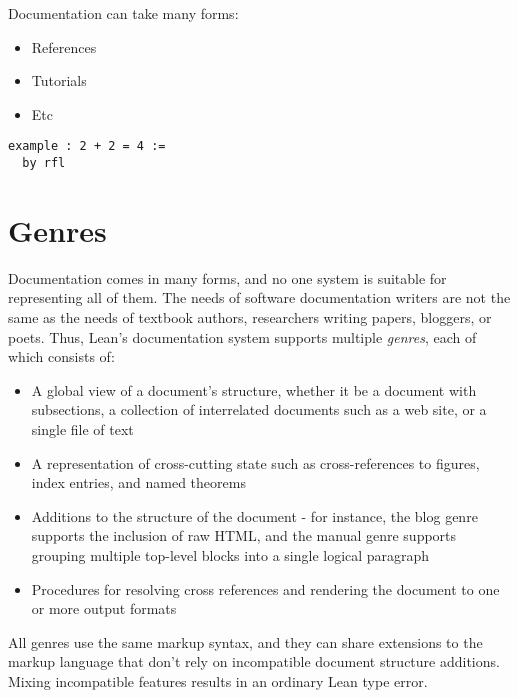\documentclass{memoir}
\begin{document}
Documentation can take many forms:

\begin{itemize}
\item References\item Tutorials\item Etc
\end{itemize}


\begin{verbatim}
example : 2 + 2 = 4 :=
  by rfl

\end{verbatim}














\chapter{Genres}

Documentation comes in many forms, and no one system is suitable for representing all of them.
The needs of software documentation writers are not the same as the needs of textbook authors, researchers writing papers, bloggers, or poets.
Thus, Lean's documentation system supports multiple \emph{genres}, each of which consists of:
\begin{itemize}
\item A global view of a document's structure, whether it be a document with subsections, a collection of interrelated documents such as a web site, or a single file of text\item A representation of cross-cutting state such as cross-references to figures, index entries, and named theorems\item Additions to the structure of the document - for instance, the blog genre supports the inclusion of raw HTML, and the manual genre supports grouping multiple top-level blocks into a single logical paragraph\item Procedures for resolving cross references and rendering the document to one or more output formats
\end{itemize}

All genres use the same markup syntax, and they can share extensions to the markup language that don't rely on incompatible document structure additions.
Mixing incompatible features results in an ordinary Lean type error.
\end{document}
